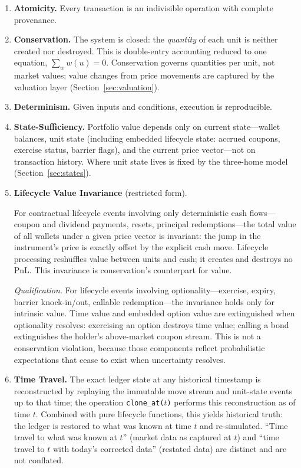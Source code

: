 \begin{enumerate}
\item \textbf{Atomicity.} Every transaction is an indivisible operation with complete provenance.

\item \textbf{Conservation.} The system is closed: the \emph{quantity} of each unit is neither created nor destroyed. This is double-entry accounting reduced to one equation, $\sum_w w(u) = 0$. Conservation governs quantities per unit, not market values; value changes from price movements are captured by the valuation layer (Section~\ref{sec:valuation}).

\item \textbf{Determinism.} Given inputs and conditions, execution is reproducible.

\item \textbf{State-Sufficiency.} Portfolio value depends only on current state---wallet balances, unit state (including embedded lifecycle state: accrued coupons, exercise status, barrier flags), and the current price vector---not on transaction history. Where unit state lives is fixed by the three-home model (Section~\ref{sec:states}).

\item \textbf{Lifecycle Value Invariance} (restricted form). \label{prop:lifecycle-value-invariance} {\setlength{\emergencystretch}{2em}For contractual lifecycle events involving only deterministic cash flows---\allowbreak coupon and dividend payments, resets, principal redemptions---\allowbreak the total value of all wallets under a given price vector is invariant: the jump in the instrument's price is exactly offset by the explicit cash move. Lifecycle processing reshuffles value between units and cash; it creates and destroys no PnL. This invariance is conservation's counterpart for value.\par}

\textit{Qualification.} For lifecycle events involving optionality---exercise, expiry, barrier knock-in/out, callable redemption---the invariance holds only for intrinsic value. Time value and embedded option value are extinguished when optionality resolves: exercising an option destroys time value; calling a bond extinguishes the holder's above-market coupon stream. This is not a conservation violation, because those components reflect probabilistic expectations that cease to exist when uncertainty resolves.

\item \textbf{Time Travel.} \label{prop:time-travel} The exact ledger state at any historical timestamp is reconstructed by replaying the immutable move stream and unit-state events up to that time; the operation \texttt{clone\_at($t$)} performs this reconstruction as of time $t$. Combined with pure lifecycle functions, this yields historical truth: the ledger is restored to what was known at time $t$ and re-simulated. ``Time travel to what was known at $t$'' (market data as captured at $t$) and ``time travel to $t$ with today's corrected data'' (restated data) are distinct and are not conflated.
\end{enumerate}

